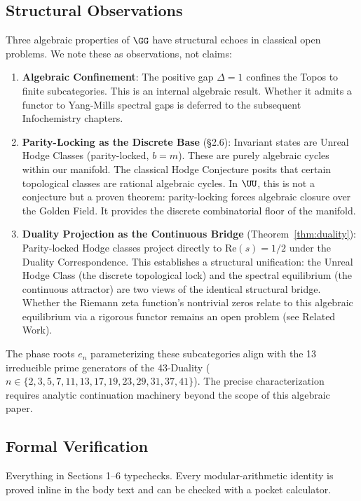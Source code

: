 \subsection{Structural Observations}

Three algebraic properties of $\GG$ have structural echoes in classical open problems. We note these as observations, not claims:

\begin{enumerate}
\item \textbf{Algebraic Confinement}: The positive gap $\Delta = 1$ confines the Topos to finite subcategories. This is an internal algebraic result. Whether it admits a functor to Yang-Mills spectral gaps is deferred to the subsequent Infochemistry chapters.
\item \textbf{Parity-Locking as the Discrete Base} (\S2.6): Invariant states are Unreal Hodge Classes (parity-locked, $b=m$). These are purely algebraic cycles within our manifold. The classical Hodge Conjecture posits that certain topological classes are rational algebraic cycles. In $\UU$, this is not a conjecture but a proven theorem: parity-locking forces algebraic closure over the Golden Field. It provides the discrete combinatorial floor of the manifold.
\item \textbf{Duality Projection as the Continuous Bridge} (Theorem~\ref{thm:duality}): Parity-locked Hodge classes project directly to $\mathrm{Re}(s) = 1/2$ under the Duality Correspondence. This establishes a structural unification: the Unreal Hodge Class (the discrete topological lock) and the spectral equilibrium (the continuous attractor) are two views of the identical structural bridge. Whether the Riemann zeta function's nontrivial zeros relate to this algebraic equilibrium via a rigorous functor remains an open problem (see Related Work).
\end{enumerate}

The phase roots $e_n$ parameterizing these subcategories align with the 13 irreducible prime generators of the 43-Duality ($n \in \{2,3,5,7,11,13,17,19,23,29,31,37,41\}$). The precise characterization requires analytic continuation machinery beyond the scope of this algebraic paper.

\subsection{Formal Verification}

Everything in Sections 1--6 typechecks. Every modular-arithmetic identity is proved inline in the body text and can be checked with a pocket calculator.

